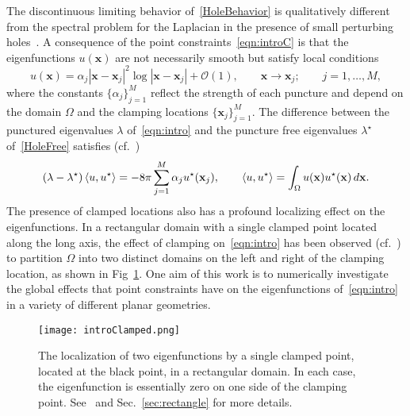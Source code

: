\documentclass[times]{article}
\newcommand{\xx}{\mathbf{x}}
\newcommand{\bigoh}{\mathcal{O}}
\begin{document}
%
%
%
%
The discontinuous limiting behavior of~\eqref{HoleBehavior} is
qualitatively different from the spectral problem for the Laplacian in
the presence of small perturbing holes~\cite{F,KTW,O,WHK,WK}. A
consequence of the point constraints~\eqref{eqn:introC} is that the
eigenfunctions $u(\xx)$ are not necessarily smooth but satisfy local
conditions
\begin{equation}\label{behaviorLocal}
  u(\xx) = \alpha_j |\xx - \xx_j|^2 \log|\xx - \xx_j| + 
    \bigoh(1), \qquad \xx\to\xx_j; \qquad j = 1,\ldots,M,
\end{equation}
where the constants $\{\alpha_j\}_{j=1}^M$ reflect the strength of each
puncture and depend on the domain $\Omega$ and the clamping locations
$\{\xx_j\}_{j=1}^M$. The difference between the punctured eigenvalues
$\lambda$ of~\eqref{eqn:intro} and the puncture free eigenvalues
$\lambda^{\star}$ of~\eqref{HoleFree} satisfies (cf.~\cite{LHS}) 
\begin{align}
  \label{EigDifference}
  (\lambda - \lambda^{\star}) \braket{u,u^{\star}} = 
  -8\pi\sum_{j=1}^M \alpha_j u^{\star}(\xx_j), \qquad 
  \braket{u,u^{\star}} = \int_{\Omega} u(\xx) u^{\star}(\xx)\, d\xx.
\end{align}
The presence of clamped locations also has a profound localizing effect
on the eigenfunctions. In a rectangular domain with a single clamped
point located along the long axis, the effect of clamping
on~\eqref{eqn:intro} has been observed (cf.~\cite{FM}) to partition
$\Omega$ into two distinct domains on the left and right of the clamping
location, as shown in Fig~\ref{fig:introClamp}. One aim of this work is
to numerically investigate the global effects that point constraints
have on the eigenfunctions of~\eqref{eqn:intro} in a variety of
different planar geometries.
 
\begin{figure}[htbp]
\centering
\texttt{[image: introClamped.png]}
\parbox{0.75\textwidth}{ \caption{The localization of two eigenfunctions
by a single clamped point, located at the black point, in a rectangular
domain. In each case, the eigenfunction is essentially zero on one side
of the clamping point. See~\cite{FM} and Sec.~\ref{sec:rectangle} for
more details.  \label{fig:introClamp} }}
\end{figure}
 
\end{document}
